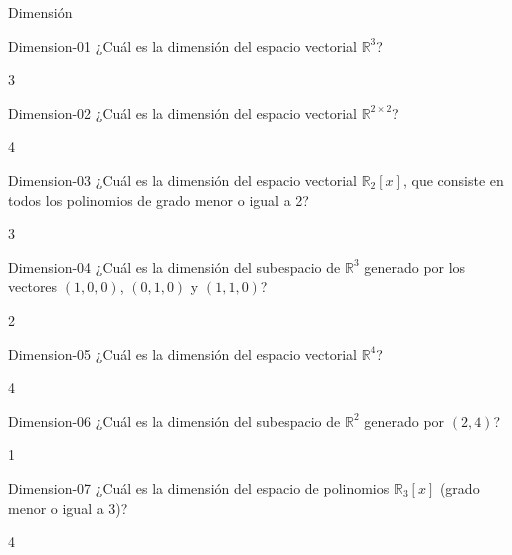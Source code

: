 \documentclass[a4,11pt]{aleph-notas}
\begin{document}
\begin{quiz}{Dimensión}
\begin{numerical}[tolerance=0]%
    {Dimension-01}
    ¿Cuál es la dimensión del espacio vectorial \( \mathbb{R}^3 \)?
    \item 3
\end{numerical}

\begin{numerical}[tolerance=0]%
    {Dimension-02}
    ¿Cuál es la dimensión del espacio vectorial $\mathbb{R}^{2\times 2}$?
    \item 4
\end{numerical}

\begin{numerical}[tolerance=0]%
    {Dimension-03}
    ¿Cuál es la dimensión del espacio vectorial \( \mathbb{R}_2[x] \), que consiste en todos los polinomios de grado menor o igual a 2?
    \item 3
\end{numerical}

\begin{numerical}[tolerance=0]%
    {Dimension-04}
    ¿Cuál es la dimensión del subespacio de \(\mathbb{R}^3\) generado por los vectores \((1,0,0)\), \((0,1,0)\) y \((1,1,0)\)?
    \item 2
\end{numerical}

\begin{numerical}[tolerance=0]%
    {Dimension-05}
    ¿Cuál es la dimensión del espacio vectorial \(\mathbb{R}^4\)?
    \item 4
\end{numerical}

\begin{numerical}[tolerance=0]%
    {Dimension-06}
    ¿Cuál es la dimensión del subespacio de \(\mathbb{R}^2\) generado por \((2,4)\)?
    \item 1
\end{numerical}

\begin{numerical}[tolerance=0]%
    {Dimension-07}
    ¿Cuál es la dimensión del espacio de polinomios \(\mathbb{R}_3[x]\) (grado menor o igual a 3)?
    \item 4
\end{numerical}


\end{quiz}
\end{document}
